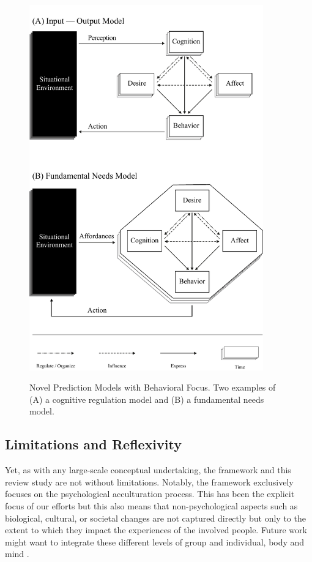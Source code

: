 \documentclass[man, 12pt, a4paper, mask]{apa7}
\begin{document}


\begin{figure}[ht!]
\centering
    \caption{Novel Prediction Models with Behavioral Focus. Two examples of (A) a cognitive regulation model and (B) a fundamental needs model.}
\includegraphics[width=0.9\textwidth]{Figures/NovelPredictionsBehaviorTime.pdf}
\label{fig:NovelModels}
\end{figure}

\subsection{Limitations and Reflexivity}
Yet, as with any large-scale conceptual undertaking, the framework and this review study are not without limitations. Notably, the framework exclusively focuses on the psychological acculturation process. This has been the explicit focus of our efforts but this also means that non-psychological aspects such as biological, cultural, or societal changes are not captured directly but only to the extent to which they impact the experiences of the involved people. Future work might want to integrate these different levels of group and individual, body and mind \citep[e.g.,][]{Eronen2021}. 
\end{document}
